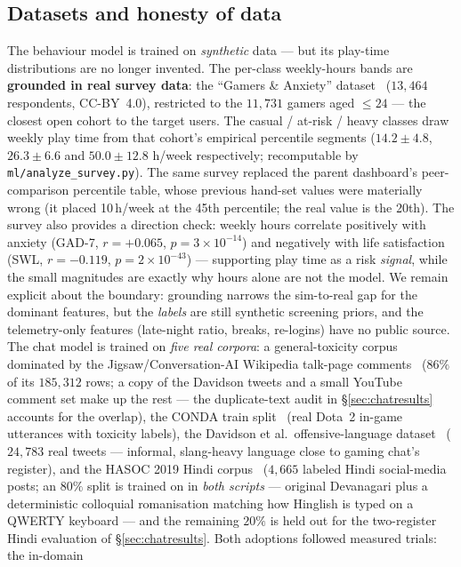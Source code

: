\documentclass[11pt,a4paper]{article}
\begin{document}
\subsection{Datasets and honesty of data}
The behaviour model is trained on \emph{synthetic} data --- but its play-time
distributions are no longer invented. The per-class weekly-hours bands are
\textbf{grounded in real survey data}: the ``Gamers \& Anxiety''
dataset~\cite{sauter2017} ($13{,}464$ respondents, CC-BY~4.0), restricted to the $11{,}731$
gamers aged $\leq 24$ --- the closest open cohort to the target users. The casual /
at-risk / heavy classes draw weekly play time from that cohort's empirical
percentile segments ($14.2 \pm 4.8$, $26.3 \pm 6.6$ and $50.0 \pm 12.8$ h/week
respectively; recomputable by \texttt{ml/analyze\_survey.py}). The same survey
replaced the parent dashboard's peer-comparison percentile table, whose previous
hand-set values were materially wrong (it placed 10\,h/week at the 45th percentile;
the real value is the 20th). The survey also provides a direction check: weekly hours
correlate positively with anxiety (GAD-7, $r{=}{+}0.065$, $p{=}3\times10^{-14}$) and
negatively with life satisfaction (SWL, $r{=}{-}0.119$, $p{=}2\times10^{-43}$) ---
supporting play time as a risk \emph{signal}, while the small magnitudes are exactly
why hours alone are not the model. We remain explicit about the boundary: grounding
narrows the sim-to-real gap for the dominant features, but the \emph{labels} are
still synthetic screening priors, and the telemetry-only features (late-night ratio,
breaks, re-logins) have no public source. The chat model is trained on \emph{five
real corpora}: a general-toxicity corpus dominated by the Jigsaw/Conversation-AI
Wikipedia talk-page comments~\cite{jigsaw2018} ($86\%$ of its $185{,}312$ rows; a
copy of the Davidson tweets and a small YouTube comment set make up the rest ---
the duplicate-text audit in \S\ref{sec:chatresults} accounts for the overlap), the
CONDA train split~\cite{conda2021} (real Dota~2
in-game utterances with toxicity labels), the Davidson et al.\ offensive-language
dataset~\cite{davidson2017} ($24{,}783$ real tweets --- informal, slang-heavy language close to gaming
chat's register), and the HASOC 2019 Hindi corpus~\cite{hasoc2019} ($4{,}665$
labeled Hindi social-media posts; an $80\%$ split is trained on in \emph{both
scripts} --- original Devanagari plus a deterministic colloquial romanisation
matching how Hinglish is typed on a QWERTY keyboard --- and the remaining $20\%$
is held out for the two-register Hindi evaluation of
\S\ref{sec:chatresults}. Both adoptions followed measured trials: the in-domain
\end{document}
